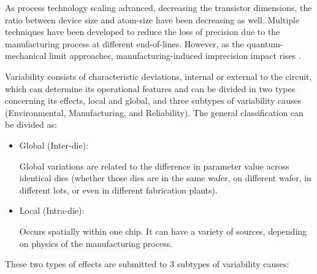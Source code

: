\documentclass[pgmicro,diss,english]{iiufrgs}
\begin{document}
As process technology scaling advanced, decreasing the transistor dimensions, the ratio between device size and atom-size have been decreasing as well. Multiple techniques have been developed to reduce the loss of precision due to the manufacturing process at different end-of-lines. However, as the quantum-mechanical limit approaches, manufacturing-induced imprecision impact rises \cite{asenov1999random} \cite{neuberger2014protecting}.

Variability consists of characteristic deviations, internal or external to the circuit, which can determine its operational features and can be divided in two types concerning its effects, local and global, and three subtypes of variability causes (Environmental, Manufacturing, and Reliability). The general classification can be divided as:

\begin{itemize}

\item Global (Inter-die):

	Global variations are related to the difference in parameter value across identical dies (whether those dies are in the same wafer, on different wafer, in different lots, or even in different fabrication plants).

\item Local (Intra-die):

	Occurs spatially within one chip. It can have a variety of sources, depending on physics of the manufacturing process.

\end{itemize}

	These two types of effects are submitted to 3 subtypes of variability causes:
\end{document}
